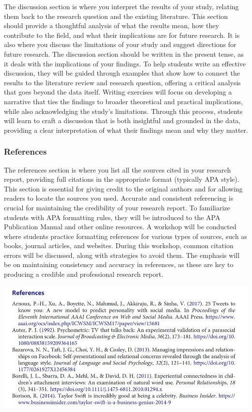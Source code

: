 \documentclass[
]{book}
\begin{document}
The discussion section is where you interpret the results of your study, relating them back to the research question and the existing literature. This section should provide a thoughtful analysis of what the results mean, how they contribute to the field, and what their implications are for future research. It is also where you discuss the limitations of your study and suggest directions for future research. The discussion section should be written in the present tense, as it deals with the implications of your findings. To help students write an effective discussion, they will be guided through examples that show how to connect the results to the literature review and research question, offering a critical analysis that goes beyond the data itself. Writing exercises will focus on developing a narrative that ties the findings to broader theoretical and practical implications, while also acknowledging the study's limitations. Through this process, students will learn to craft a discussion that is both insightful and grounded in the data, providing a clear interpretation of what their findings mean and why they matter.

\subsubsection*{References}\label{references}

The references section is where you list all the sources cited in your research report, providing full citations in the appropriate format (typically APA style). This section is essential for giving credit to the original authors and for allowing readers to locate the sources you used. Accurate and consistent referencing is crucial for maintaining the credibility of your research report. To familiarize students with APA formatting rules, they will be introduced to the APA Publication Manual and other online resources. A workshop will be conducted where students practice formatting references for various types of sources, such as books, journal articles, and websites. During this workshop, common citation errors will be discussed, along with strategies to avoid them. The emphasis will be on maintaining consistency and accuracy in references, as these are key to producing a credible and professional research report.

\includegraphics[width=1\textwidth,height=\textheight]{images/fig085.jpg}
\end{document}
